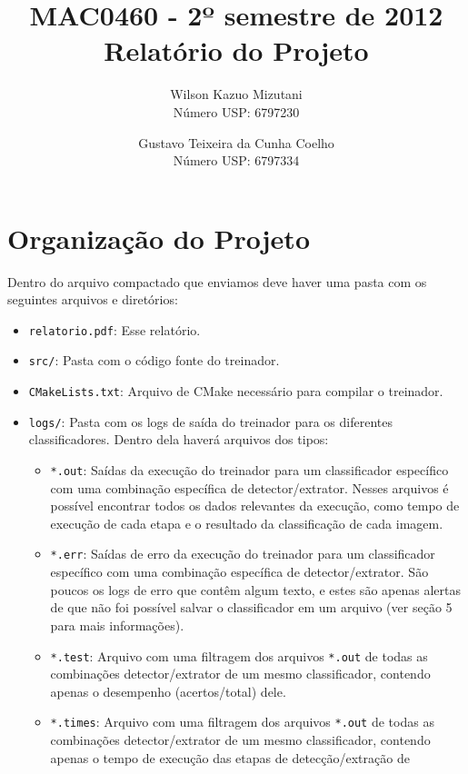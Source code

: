 \documentclass[a4paper,11pt]{article}
\title{MAC0460 - 2º semestre de 2012 \\ Relatório do Projeto}
\author{
  Wilson Kazuo Mizutani\\
  Número USP: 6797230
  \and
  Gustavo Teixeira da Cunha Coelho\\
  Número USP: 6797334
}
\begin{document}
\maketitle

\section{Organização do Projeto}

  Dentro do arquivo compactado que enviamos deve haver uma pasta com os
  seguintes arquivos e diretórios:

  \begin{itemize}
    \item \verb$relatorio.pdf$:
      Esse relatório.
    \item \verb$src/$:
      Pasta com o código fonte do treinador.
    \item \verb$CMakeLists.txt$:
      Arquivo de CMake necessário para compilar o treinador.
    \item \verb$logs/$:
      Pasta com os logs de saída do treinador para os diferentes
      classificadores. Dentro dela haverá arquivos dos tipos:
      \begin{itemize}
        \item \verb$*.out$:
          Saídas da execução do treinador para um classificador específico com
          uma combinação específica de detector/extrator. Nesses arquivos é
          possível encontrar todos os dados relevantes da execução, como tempo
          de execução de cada etapa e o resultado da classificação de cada
          imagem.
        \item \verb$*.err$:
          Saídas de erro da execução do treinador para um classificador
          específico com uma combinação específica de detector/extrator. São
          poucos os logs de erro que contêm algum texto, e estes são apenas
          alertas de que não foi possível salvar o classificador em um arquivo
          (ver seção 5 para mais informações).
        \item \verb$*.test$:
          Arquivo com uma filtragem dos arquivos \verb$*.out$ de todas as
          combinações detector/extrator de um mesmo classificador, contendo
          apenas o desempenho (acertos/total) dele.
        \item \verb$*.times$:
          Arquivo com uma filtragem dos arquivos \verb$*.out$ de todas as
          combinações detector/extrator de um mesmo classificador, contendo
          apenas o tempo de execução das etapas de detecção/extração de

\end{itemize}
\end{itemize}
\end{document}
